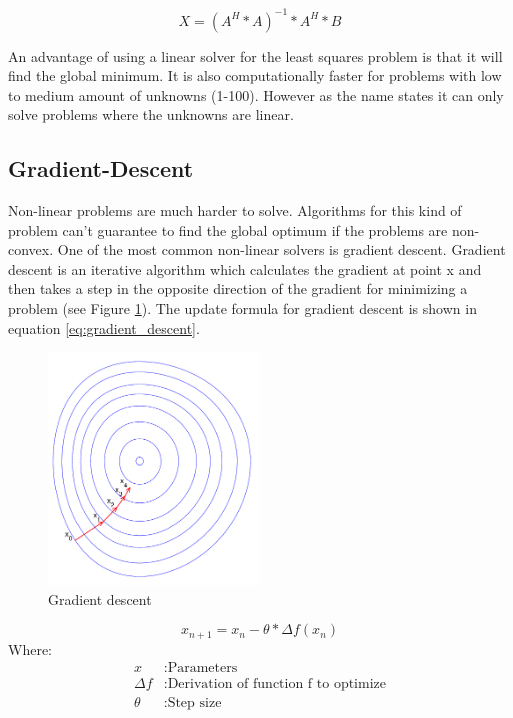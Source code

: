 \documentclass[11pt,a4paper,titlepage,oneside]{report}
\begin{document}
\begin{equation}\label{eq:least_squares_algorithm}
  X=(A^H*A)^{-1}*A^H*B 
\end{equation}

An advantage of using a linear solver for the least squares problem is that it will find the global minimum. It is also computationally faster for problems with low to medium amount of unknowns (1-100). However as the name states it can only solve problems where the unknowns are linear.

\subsection{Gradient-Descent}
Non-linear problems are much harder to solve. Algorithms for this kind of problem can't guarantee to find the global optimum if the problems are non-convex. One of the most common non-linear solvers is gradient descent. Gradient descent is an iterative algorithm which calculates the gradient at point x and then takes a step in the opposite direction of the gradient for minimizing a problem (see Figure \ref{fig:gradient_descent}). The update formula for gradient descent is shown in equation \ref{eq:gradient_descent}.
\begin{figure}[H]
  \begin{center}
    \includegraphics[width=0.5\textwidth]{img/gradient_descent.png}
  \end{center}
    \caption{Gradient descent}\label{fig:gradient_descent}
\end{figure}

\begin{equation}\label{eq:gradient_descent}
  x_{n+1}=x_n-\theta*\Delta f(x_n)
\end{equation}
Where:
\begin{align*}
  x		      &: \text{Parameters}\\
  \Delta f  &: \text{Derivation of function f to optimize}\\
  \theta    &: \text{Step size}
\end{align*}
\end{document}

